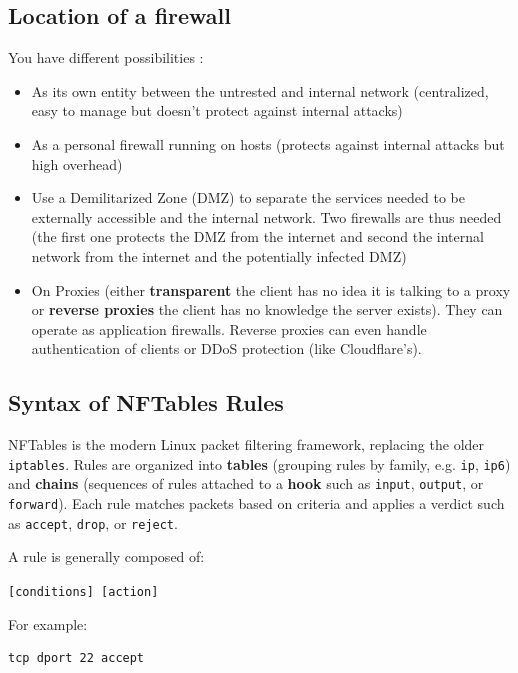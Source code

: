 \subsection{Location of a firewall}
You have different possibilities : 
\begin{itemize} 
    \item As its own entity between the untrested and internal network (centralized, easy to manage but doesn't protect against internal attacks)
    \item As a personal firewall running on hosts (protects against internal attacks but high overhead)
    \item Use a Demilitarized Zone (DMZ) to separate the services needed to be externally accessible and the internal network. Two firewalls are thus needed (the first one protects the DMZ from the internet and second the internal network from the internet and the potentially infected DMZ)
    \item On Proxies (either \textbf{transparent} the client has no idea it is talking to a proxy or \textbf{reverse proxies} the client has no knowledge the server exists). They can operate as application firewalls. Reverse proxies can even handle authentication of clients or DDoS protection (like Cloudflare's).
\end{itemize}

\subsection{Syntax of NFTables Rules}

NFTables is the modern Linux packet filtering framework, replacing the older \texttt{iptables}. Rules are organized into \textbf{tables} (grouping rules by family, e.g. \texttt{ip}, \texttt{ip6}) and \textbf{chains} (sequences of rules attached to a \textbf{hook} such as \texttt{input}, \texttt{output}, or \texttt{forward}). Each rule matches packets based on criteria and applies a verdict such as \texttt{accept}, \texttt{drop}, or \texttt{reject}.

A rule is generally composed of:

\begin{center}
\texttt{[conditions] [action]}
\end{center}

For example:

\begin{lstlisting}[language=bash]
tcp dport 22 accept
\end{lstlisting}

